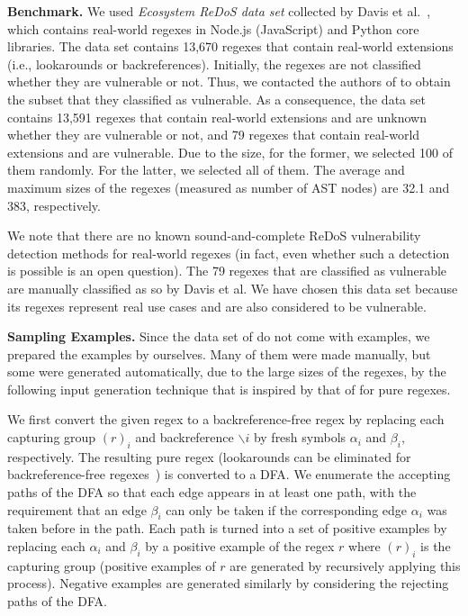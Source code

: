 \documentclass[conference]{IEEEtran}
\newcommand{\tchanged}[2]{#2}
\begin{document}
{\flushleft\bf Benchmark.}
We used {\it Ecosystem ReDoS data set} collected by Davis et al.~\cite{Davis:2018:IRE:3236024.3236027}, which contains real-world regexes in Node.js (JavaScript) and Python core libraries.
The data set contains 13,670 regexes that contain real-world extensions (i.e., lookarounds or backreferences).
Initially, the regexes are not classified whether they are vulnerable or not.
Thus, we contacted the authors of \cite{Davis:2018:IRE:3236024.3236027} to obtain the subset that they classified as vulnerable.
As a \tchanged{consequent}{consequence}, the data set contains 13,591 regexes that contain real-world extensions and are unknown whether they are vulnerable or not, and 79 regexes that contain real-world extensions and are vulnerable.
Due to the size, for the former, we selected 100 of them randomly. For the latter, we selected all of them.
The average and maximum sizes of the regexes (measured as number of AST nodes) are 32.1 and 383, respectively.


We note that there are no known sound-and-complete ReDoS vulnerability detection methods for real-world regexes (in fact, even whether such a detection is possible is an open question).
The 79 regexes that are classified as vulnerable are manually classified as so by Davis et al.
We have chosen this data set because its regexes represent real use cases and are also considered to be vulnerable. 







{\flushleft\bf Sampling Examples.}
Since the data set of \cite{Davis:2018:IRE:3236024.3236027} do not come with examples, we prepared the examples by ourselves.  
Many of them were made manually, but some were generated automatically, due to the large sizes of the regexes, by the following input generation technique that is inspired by that of \cite{10.1145/3236024.3236072} for pure regexes.

We first convert the given regex to a backreference-free regex by replacing each capturing group $(r)_i$ and backreference $\backslash i$ by fresh symbols $\alpha_i$ and $\beta_i$, respectively.  The resulting pure regex (lookarounds can be eliminated for backreference-free regexes~\cite{DBLP:journals/jip/MiyazakiM19}) is converted to a DFA.  We enumerate the accepting paths of the DFA so that each edge appears in at least one path, with the requirement that an edge $\beta_i$ can only be taken if the corresponding edge $\alpha_i$ was taken before in the path.  Each path is turned into a set of positive examples by replacing each $\alpha_i$ and $\beta_i$ by a positive example of the regex $r$ where $(r)_i$ is the capturing group (positive examples of $r$ are generated by recursively applying this process).  Negative examples are generated similarly by considering the rejecting paths of the DFA. 
\end{document}
